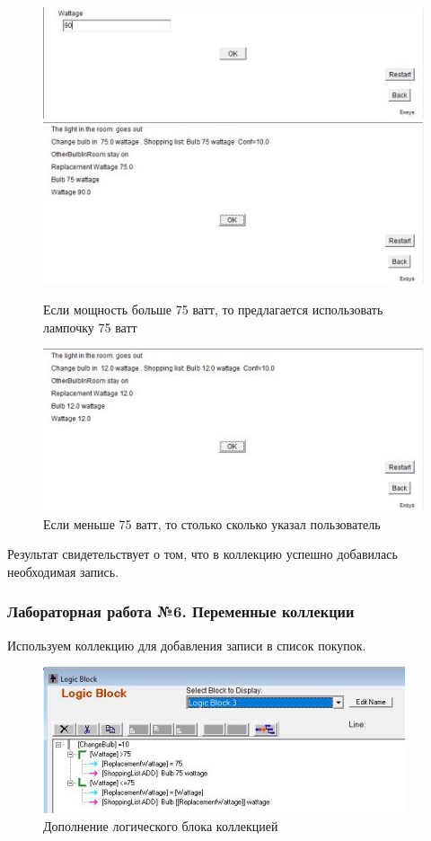 \documentclass[14pt,a4paper,report]{report}
\begin{document}
\begin{figure}[ht!]
	\includegraphics[width=.55\textwidth]{images/5_2.jpg}\hfill
	\includegraphics[width=.45\textwidth]{images/5_3.jpg}
	\caption{Если мощность больше 75 ватт, то предлагается использовать лампочку 75 ватт}
\end{figure}


\begin{figure}[h!]
	\includegraphics[width=.80\textwidth]{images/5_5.jpg}
	\caption{Если меньше 75 ватт, то столько сколько указал пользователь}
\end{figure}

Результат свидетельствует о том, что в коллекцию успешно добавилась необходимая запись.


\subsubsection{Лабораторная работа №6. Переменные коллекции}

Используем коллекцию для добавления записи в список покупок. 

\begin{figure}[h!]
	\centering
	\includegraphics[scale = 1.1]{images/6_1.jpg}
	\caption{Дополнение логического блока коллекцией}
\end{figure}
\end{document}
